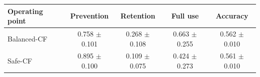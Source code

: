 \begin{tabular}{lcccc}
\toprule
Operating point & Prevention & Retention & Full use & Accuracy \\
\midrule
Balanced-CF & 0.758 $\pm$ 0.101 & 0.268 $\pm$ 0.108 & 0.663 $\pm$ 0.255 & 0.562 $\pm$ 0.010 \\
Safe-CF & 0.895 $\pm$ 0.100 & 0.109 $\pm$ 0.075 & 0.424 $\pm$ 0.273 & 0.561 $\pm$ 0.010 \\
\bottomrule
\end{tabular}
